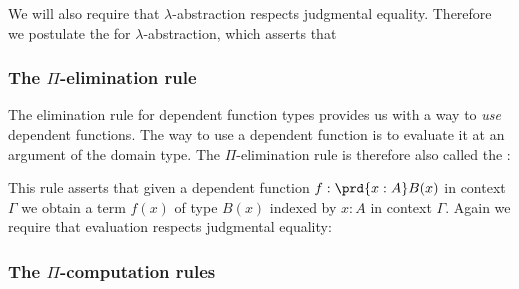 We will also require that $\lambda$-abstraction respects judgmental equality. Therefore we postulate the  for $\lambda$-abstraction,
which asserts that\label{page:lambda-eq}
\begin{prooftree}
\end{prooftree}

\subsubsection{The $\Pi$-elimination rule}

The elimination rule for dependent function types provides us with a way to \emph{use} dependent functions. The way to use a dependent function is to evaluate it at an argument of the domain type. The $\Pi$-elimination rule is therefore also called the :
\begin{prooftree}
\end{prooftree}
This rule asserts that given a dependent function $f:\prd{x:A}B(x)$ in context $\Gamma$ we obtain a term $f(x)$ of type $B(x)$ indexed by $x:A$ in context $\Gamma$. Again we require that evaluation respects judgmental equality:
\begin{prooftree}
\end{prooftree}

\subsubsection{The $\Pi$-computation rules}

